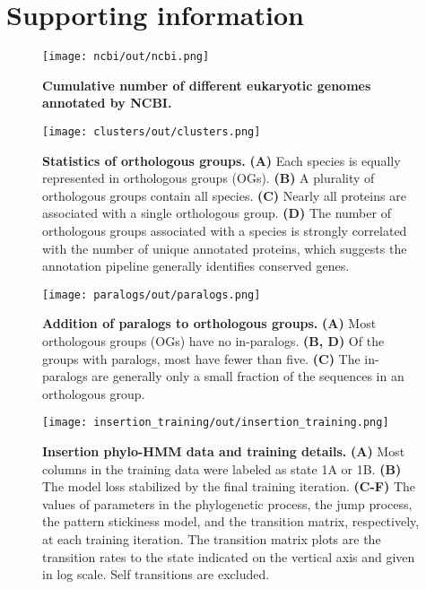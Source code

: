 \section*{Supporting information}

\begin{figure}[h!]
\texttt{[image: ncbi/out/ncbi.png]}
\centering
\caption{\textbf{Cumulative number of different eukaryotic genomes annotated by NCBI.}}
\label{sfig:ncbi}
\end{figure}

\begin{figure}[h!]
\texttt{[image: clusters/out/clusters.png]}
\centering
\caption{\textbf{Statistics of orthologous groups.}
\textbf{(A)} Each species is equally represented in orthologous groups (OGs). \textbf{(B)} A plurality of orthologous groups contain all species. \textbf{(C)} Nearly all proteins are associated with a single orthologous group. \textbf{(D)} The number of orthologous groups associated with a species is strongly correlated with the number of unique annotated proteins, which suggests the annotation pipeline generally identifies conserved genes.}
\label{sfig:clusters}
\end{figure}

\begin{figure}[h!]
\texttt{[image: paralogs/out/paralogs.png]}
\centering
\caption{\textbf{Addition of paralogs to orthologous groups.}
\textbf{(A)} Most orthologous groups (OGs) have no in-paralogs. \textbf{(B, D)} Of the groups with paralogs, most have fewer than five. \textbf{(C)} The in-paralogs are generally only a small fraction of the sequences in an orthologous group.}
\label{sfig:paralogs}
\end{figure}

\begin{figure}[h!]
\texttt{[image: insertion\_training/out/insertion\_training.png]}
\centering
\caption{\textbf{Insertion phylo-HMM data and training details.}
\textbf{(A)} Most columns in the training data were labeled as state 1A or 1B. \textbf{(B)} The model loss stabilized by the final training iteration. \textbf{(C-F)} The values of parameters in the phylogenetic process, the jump process, the pattern stickiness model, and the transition matrix, respectively, at each training iteration. The transition matrix plots are the transition rates to the state indicated on the vertical axis and given in log scale. Self transitions are excluded.}
\label{sfig:insertion_training}
\end{figure}

